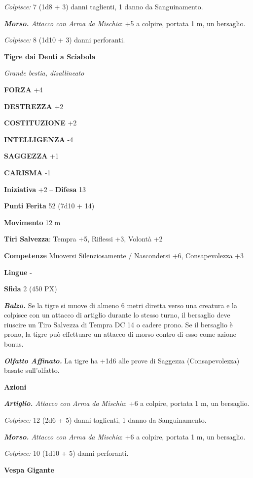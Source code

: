 \begin{multicols}{2}
\textit{Colpisce:} 7 (1d8 + 3) danni taglienti, 1 danno da Sanguinamento.

\textit{\textbf{Morso.} Attacco con Arma da Mischia}: +5 a colpire, portata 1 m, un bersaglio.

\textit{Colpisce:} 8 (1d10 + 3) danni perforanti.

\medskip\textbf{Tigre dai Denti a Sciabola}

\textit{Grande bestia, disallineato}

\textbf{FORZA} +4

\textbf{DESTREZZA} +2

\textbf{COSTITUZIONE} +2

\textbf{INTELLIGENZA} -4

\textbf{SAGGEZZA} +1

\textbf{CARISMA} -1

\textbf{Iniziativa} +2 -- \textbf{Difesa} 13

\textbf{Punti Ferita} 52 (7d10 + 14)

\textbf{Movimento} 12 m

\textbf{Tiri Salvezza}: Tempra +5, Riflessi +3, Volontà +2

\textbf{Competenze} Muoversi Silenziosamente / Nascondersi +6, Consapevolezza +3

\textbf{Lingue} -

\textbf{Sfida} 2 (450 PX)

\textit{\textbf{Balzo.}} Se la tigre si muove di almeno 6 metri diretta verso una creatura e la colpisce con un attacco di artiglio durante lo stesso turno, il bersaglio deve riuscire un Tiro Salvezza di Tempra DC 14 o cadere prono. Se il bersaglio è prono, la tigre può effettuare un attacco di morso contro di esso come azione bonus.

\textit{\textbf{Olfatto Affinato.}} La tigre ha +1d6 alle prove di Saggezza (Consapevolezza) basate sull'olfatto.

\textbf{Azioni}

\textit{\textbf{Artiglio.} Attacco con Arma da Mischia}: +6 a colpire, portata 1 m, un bersaglio.

\textit{Colpisce:} 12 (2d6 + 5) danni taglienti, 1 danno da Sanguinamento.

\textit{\textbf{Morso.} Attacco con Arma da Mischia}: +6 a colpire, portata 1 m, un bersaglio.

\textit{Colpisce:} 10 (1d10 + 5) danni perforanti.

\medskip\textbf{Vespa Gigante}


\end{multicols}
